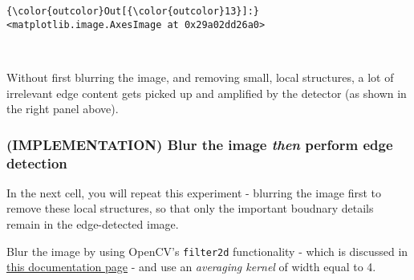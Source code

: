 \documentclass[11pt]{article}
\begin{document}
\begin{Verbatim}[commandchars=\\\{\}]
{\color{outcolor}Out[{\color{outcolor}13}]:} <matplotlib.image.AxesImage at 0x29a02dd26a0>
\end{Verbatim}
            
    \begin{center}
    \end{center}
    { \hspace*{\fill} \\}
    
    Without first blurring the image, and removing small, local structures,
a lot of irrelevant edge content gets picked up and amplified by the
detector (as shown in the right panel above).

    \subsubsection{\texorpdfstring{(IMPLEMENTATION) Blur the image
\emph{then} perform edge
detection}{(IMPLEMENTATION) Blur the image then perform edge detection}}\label{implementation-blur-the-image-then-perform-edge-detection}

In the next cell, you will repeat this experiment - blurring the image
first to remove these local structures, so that only the important
boudnary details remain in the edge-detected image.

Blur the image by using OpenCV's \texttt{filter2d} functionality - which
is discussed in
\href{http://docs.opencv.org/3.1.0/d4/d13/tutorial_py_filtering.html}{this
documentation page} - and use an \emph{averaging kernel} of width equal
to 4.
\end{document}
